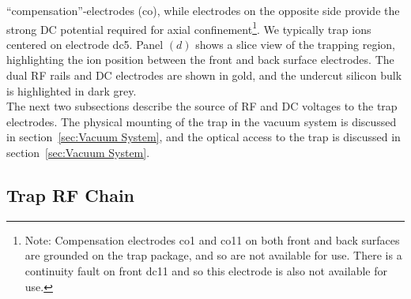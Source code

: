     ``compensation''-electrodes (co), while electrodes on the opposite side
    provide the strong DC potential required for axial
    confinement\footnote{Note: Compensation electrodes co1 and co11 on both
    front and back surfaces are grounded on the trap package, and so are not
    available for use. There is a continuity fault on front dc11 and so this
    electrode is also not available for use.}.
    We typically
    trap ions centered on electrode dc5. Panel $(d)$ shows a slice view of the
    trapping region, highlighting the ion position between the front and back
    surface electrodes. The dual RF rails and DC electrodes are shown in gold,
    and the undercut silicon bulk is highlighted in dark grey.\\
    The next two subsections describe the source of RF and DC voltages to the trap
    electrodes. The physical mounting of the trap in the vacuum system is
    discussed in section~\ref{sec:Vacuum System}, and the optical access to the
    trap is discussed in section~\ref{sec:Vacuum System}.\\

\subsection{Trap RF Chain}
\label{sec:Trap RF Chain}

